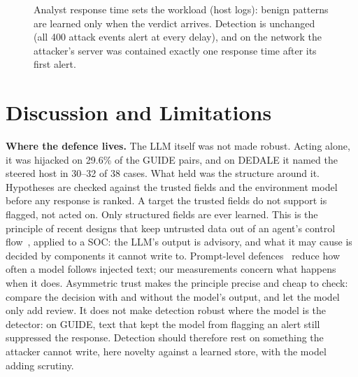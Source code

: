 \documentclass[conference]{IEEEtran}
\begin{document}
\begin{figure}[t]
\centering
{}
\caption{Analyst response time sets the workload (host logs): benign patterns are learned only when the verdict
arrives. Detection is unchanged (all 400 attack events alert at every delay), and on the network the attacker's
server was contained exactly one response time after its first alert.}
\label{fig:delay}
\end{figure}

\section{Discussion and Limitations}
\textbf{Where the defence lives.} The LLM itself was not made robust. Acting alone, it was hijacked on 29.6\% of
the GUIDE pairs, and on DEDALE it named the steered host in 30--32 of 38 cases. What held was the structure around
it. Hypotheses are checked against the trusted fields and the environment model before any response is ranked. A
target the trusted fields do not support is flagged, not acted on. Only structured fields are ever learned. This is
the principle of recent designs that keep untrusted data out of an agent's control flow~\cite{camel}, applied to a
SOC: the LLM's output is advisory, and what it may cause is decided by components it cannot write to. Prompt-level
defences~\cite{spotlighting,struq} reduce how often a model follows injected text; our measurements concern what
happens when it does. Asymmetric trust makes the principle precise and cheap to check: compare the decision with
and without the model's output, and let the model only add review. It does not make detection robust where the
model is the detector: on GUIDE, text that kept the model from flagging an alert still suppressed the response.
Detection should therefore rest on something the attacker cannot write, here novelty against a learned store,
with the model adding scrutiny.
\end{document}
